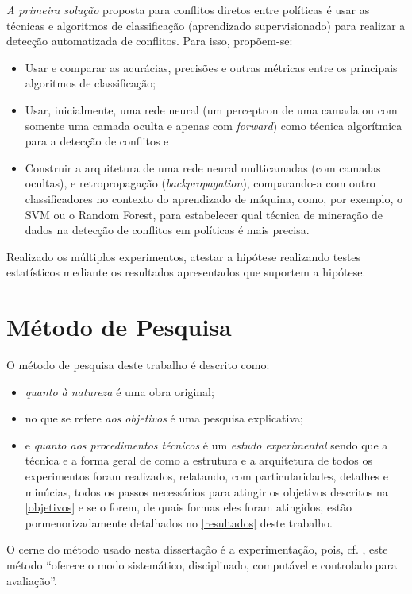 \documentclass[
	12pt,				%
	openright,			%
	oneside,			%
	a4paper,			%
	english,			%
	french,				%
	spanish,			%
	brazil				%
	]{abntex2}
\begin{document}
\textit{A primeira solução} proposta para conflitos diretos entre políticas é usar as técnicas e algoritmos de classificação (aprendizado supervisionado) para  realizar a detecção automatizada de conflitos. Para isso, propõem-se:
\begin{itemize}
	\item Usar e comparar as acurácias, precisões e outras métricas entre os principais algoritmos de classificação;
	\item Usar, inicialmente, uma rede neural (um perceptron de uma camada ou com somente uma camada oculta e apenas com \textit{forward}) como técnica algorítmica para a detecção de conflitos e
	\item Construir a arquitetura de uma rede neural multicamadas (com camadas ocultas), e retropropagação (\textit{backpropagation}), comparando-a com outro classificadores no contexto do aprendizado de máquina, como, por exemplo, o SVM ou o Random Forest, para estabelecer qual técnica de mineração de dados na detecção de conflitos em políticas é mais precisa.	
\end{itemize}
Realizado os múltiplos experimentos, atestar a hipótese realizando testes estatísticos mediante os resultados apresentados que suportem a hipótese.

\section{Método de Pesquisa}\label{metodo-pesquisa} %
O método de pesquisa deste trabalho é descrito como:
 \begin{itemize}
 	\item \textit{quanto à natureza} é uma obra original;
 	\item no que se refere \textit{aos objetivos} é uma pesquisa explicativa;
 	\item e \textit{quanto aos procedimentos técnicos} é um \textit{estudo experimental} sendo que a técnica e a forma geral de como a estrutura e a arquitetura de todos os experimentos foram realizados, relatando, com particularidades, detalhes e minúcias, todos os passos necessários para atingir os objetivos descritos na \autoref{objetivos} e se o forem, de quais formas eles foram atingidos, estão pormenorizadamente detalhados no \autoref{resultados} deste trabalho.
 \end{itemize}
O cerne do método usado nesta dissertação é a experimentação, pois, cf. , este método ``oferece o modo sistemático, disciplinado, computável e controlado para avaliação''. 
\end{document}
